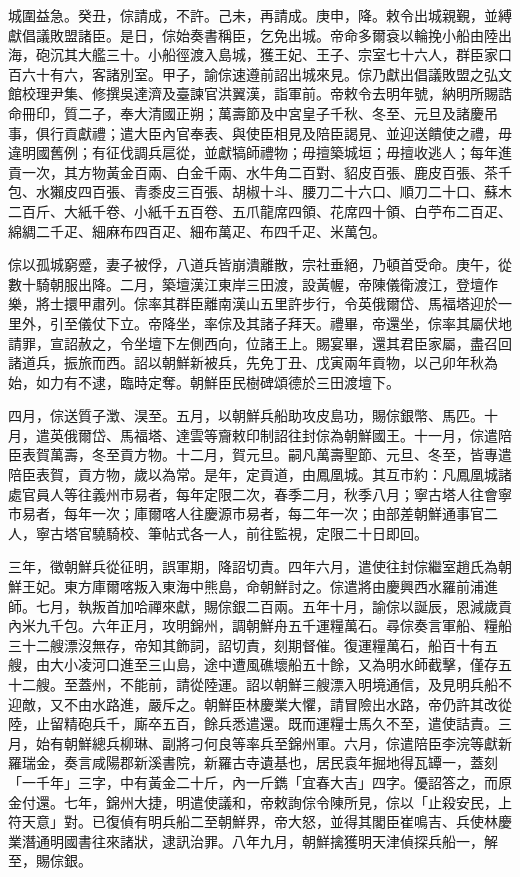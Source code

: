 \begin{pinyinscope}
城圍益急。癸丑，倧請成，不許。己未，再請成。庚申，降。敕令出城親覲，並縛獻倡議敗盟諸臣。是日，倧始奏書稱臣，乞免出城。帝命多爾袞以輪挽小船由陸出海，砲沉其大艦三十。小船徑渡入島城，獲王妃、王子、宗室七十六人，群臣家口百六十有六，客諸別室。甲子，諭倧速遵前詔出城來見。倧乃獻出倡議敗盟之弘文館校理尹集、修撰吳達濟及臺諫官洪翼漢，詣軍前。帝敕令去明年號，納明所賜誥命冊印，質二子，奉大清國正朔；萬壽節及中宮皇子千秋、冬至、元旦及諸慶吊事，俱行貢獻禮；遣大臣內官奉表、與使臣相見及陪臣謁見、並迎送饋使之禮，毋違明國舊例；有征伐調兵扈從，並獻犒師禮物；毋擅築城垣；毋擅收逃人；每年進貢一次，其方物黃金百兩、白金千兩、水牛角二百對、貂皮百張、鹿皮百張、茶千包、水獺皮四百張、青黍皮三百張、胡椒十斗、腰刀二十六口、順刀二十口、蘇木二百斤、大紙千卷、小紙千五百卷、五爪龍席四領、花席四十領、白苧布二百疋、綿綢二千疋、細麻布四百疋、細布萬疋、布四千疋、米萬包。

倧以孤城窮蹙，妻子被俘，八道兵皆崩潰離散，宗社垂絕，乃頓首受命。庚午，從數十騎朝服出降。二月，築壇漢江東岸三田渡，設黃幄，帝陳儀衛渡江，登壇作樂，將士擐甲肅列。倧率其群臣離南漢山五里許步行，令英俄爾岱、馬福塔迎於一里外，引至儀仗下立。帝降坐，率倧及其諸子拜天。禮畢，帝還坐，倧率其屬伏地請罪，宣詔赦之，令坐壇下左側西向，位諸王上。賜宴畢，還其君臣家屬，盡召回諸道兵，振旅而西。詔以朝鮮新被兵，先免丁丑、戊寅兩年貢物，以己卯年秋為始，如力有不逮，臨時定奪。朝鮮臣民樹碑頌德於三田渡壇下。

四月，倧送質子澂、淏至。五月，以朝鮮兵船助攻皮島功，賜倧銀幣、馬匹。十月，遣英俄爾岱、馬福塔、達雲等齎敕印制詔往封倧為朝鮮國王。十一月，倧遣陪臣表賀萬壽，冬至貢方物。十二月，賀元旦。嗣凡萬壽聖節、元旦、冬至，皆專遣陪臣表賀，貢方物，歲以為常。是年，定貢道，由鳳凰城。其互市約：凡鳳凰城諸處官員人等往義州市易者，每年定限二次，春季二月，秋季八月；寧古塔人往會寧市易者，每年一次；庫爾喀人往慶源市易者，每二年一次；由部差朝鮮通事官二人，寧古塔官驍騎校、筆帖式各一人，前往監視，定限二十日即回。

三年，徵朝鮮兵從征明，誤軍期，降詔切責。四年六月，遣使往封倧繼室趙氏為朝鮮王妃。東方庫爾喀叛入東海中熊島，命朝鮮討之。倧遣將由慶興西水羅前浦進師。七月，執叛首加哈禪來獻，賜倧銀二百兩。五年十月，諭倧以誕辰，恩減歲貢內米九千包。六年正月，攻明錦州，調朝鮮舟五千運糧萬石。尋倧奏言軍船、糧船三十二艘漂沒無存，帝知其飾詞，詔切責，刻期督催。復運糧萬石，船百十有五艘，由大小凌河口進至三山島，途中遭風礁壞船五十餘，又為明水師截擊，僅存五十二艘。至蓋州，不能前，請從陸運。詔以朝鮮三艘漂入明境通信，及見明兵船不迎敵，又不由水路進，嚴斥之。朝鮮臣林慶業大懼，請冒險出水路，帝仍許其改從陸，止留精砲兵千，廝卒五百，餘兵悉遣還。既而運糧士馬久不至，遣使詰責。三月，始有朝鮮總兵柳琳、副將刁何良等率兵至錦州軍。六月，倧遣陪臣李浣等獻新羅瑞金，奏言咸陽郡新溪書院，新羅古寺遺基也，居民袁年掘地得瓦罈一，蓋刻「一千年」三字，中有黃金二十斤，內一斤鐫「宜春大吉」四字。優詔答之，而原金付還。七年，錦州大捷，明遣使議和，帝敕詢倧令陳所見，倧以「止殺安民，上符天意」對。已復偵有明兵船二至朝鮮界，帝大怒，並得其閣臣崔鳴吉、兵使林慶業潛通明國書往來諸狀，逮訊治罪。八年九月，朝鮮擒獲明天津偵探兵船一，解至，賜倧銀。


\end{pinyinscope}
